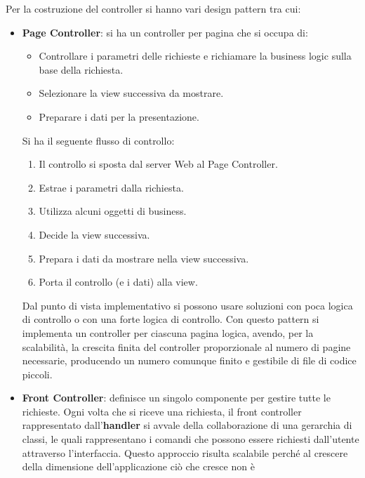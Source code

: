 Per la costruzione del controller si hanno vari design pattern tra cui:
\begin{itemize}
      \item \textbf{Page Controller}: si ha un controller per pagina che si
            occupa di:
            \begin{itemize}
                  \item Controllare i parametri delle richieste e richiamare la
                        business logic sulla base della richiesta.
                  \item Selezionare la view successiva da mostrare.
                  \item Preparare i dati per la presentazione.
            \end{itemize}
            Si ha il seguente flusso di controllo:
            \begin{enumerate}
                  \item Il controllo si sposta dal server Web al Page Controller.
                  \item Estrae i parametri dalla richiesta.
                  \item Utilizza alcuni oggetti di business.
                  \item Decide la view successiva.
                  \item Prepara i dati da mostrare nella view successiva.
                  \item Porta il controllo (e i dati) alla view.
            \end{enumerate}
            Dal punto di vista implementativo si possono usare soluzioni con
            poca logica di controllo o con una forte logica di controllo. Con
            questo pattern si implementa un controller per ciascuna pagina
            logica, avendo, per la scalabilità, la crescita finita del controller
            proporzionale al numero di pagine necessarie, producendo un numero
            comunque finito e gestibile di file di codice piccoli.
      \item \textbf{Front Controller}: definisce un singolo componente per
            gestire tutte le richieste. Ogni volta che si riceve una richiesta,
            il front controller rappresentato dall'\textbf{handler} si avvale
            della collaborazione di una gerarchia di classi, le quali
            rappresentano i comandi che possono essere richiesti dall'utente
            attraverso l'interfaccia. Questo approccio risulta scalabile perché
            al crescere della dimensione dell'applicazione ciò che cresce non è

\end{itemize}
